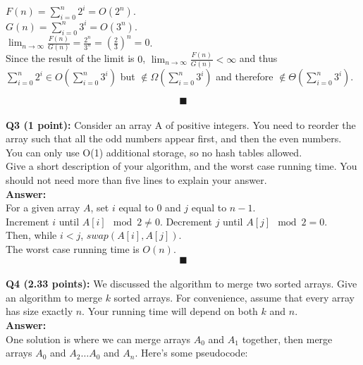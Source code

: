 \documentclass[a4paper,12pt]{article}
\begin{document}
$F(n) = \sum_{i=0}^{n}2^i = O(2^n)$.\\

$G(n) = \sum_{i=0}^{n}3^i = O(3^n)$.\\

$\lim_{n\to\infty} \frac{F(n)}{G(n)} = \frac{2^n}{3^n} = (\frac{2}{3})^n = 0$.\\

Since the result of the limit is $0$, $\lim_{n\to\infty} \frac{F(n)}{G(n)} < \infty$ and thus $\sum_{i=0}^{n}2^i \in O(\sum_{i=0}^{n}3^i)$ but $\notin \Omega(\sum_{i=0}^{n}3^i)$ and therefore $\notin \Theta(\sum_{i=0}^{n}3^i)$.

$$\blacksquare$$\\

\textbf{Q3 (1 point):} Consider an array A of positive integers. You need to reorder the array such that all the odd numbers appear first, and then the even numbers. You can only use O(1) additional storage, so no hash tables allowed.\\

Give a short description of your algorithm, and the worst case running time. You should not need more than five lines to explain your answer.\\

\textbf{Answer:}\\

For a given array $A$, set $i$ equal to $0$ and $j$ equal to $n-1$.\\

Increment $i$ until $A[i] \mod 2 \neq 0$. Decrement $j$ until $A[j] \mod 2 = 0$.\\

Then, while $i < j$, $swap(A[i], A[j])$.\\

The worst case running time is $O(n)$.\\

$$\blacksquare$$\\

\textbf{Q4 (2.33 points):} We discussed the algorithm to merge two sorted arrays. Give an algorithm to merge $k$ sorted arrays. For convenience, assume that every array has size exactly $n$. Your running time will depend on both $k$ and $n$.\\

\textbf{Answer:}\\

One solution is where we can merge arrays $A_0$ and $A_1$ together, then merge arrays $A_0$ and $A_2 \ldots A_0$ and $A_n$. Here's some pseudocode:\\
\end{document}
